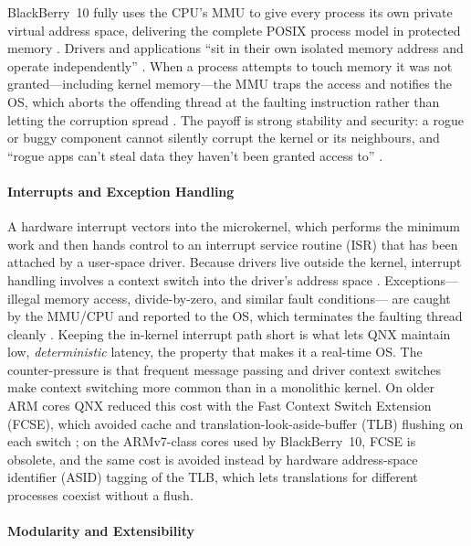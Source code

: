 BlackBerry~10 fully uses the CPU's MMU to give every process its own
private virtual address space, delivering the complete POSIX process
model in protected memory \citep{bb_microkernel_dev, qnx_memman}. Drivers and
applications ``sit in their own isolated memory address and operate
independently'' \citep{qnx_memman}. When a process attempts to touch
memory it was not granted---including kernel memory---the MMU traps the
access and notifies the OS, which aborts the offending thread at the
faulting instruction rather than letting the corruption spread
\citep{qnx_memman}. The payoff is strong stability and security: a rogue
or buggy component cannot silently corrupt the kernel or its neighbours,
and ``rogue apps can't steal data they haven't been granted access to''
\citep{crackberry_qnxhistory}.

\paragraph{Interrupts and Exception Handling}

A hardware interrupt vectors into the microkernel, which performs the
minimum work and then hands control to an interrupt service routine
(ISR) that has been attached by a user-space driver. Because drivers
live outside the kernel, interrupt handling involves a context switch
into the driver's address space \citep{qnx_arm_memory}. Exceptions---
illegal memory access, divide-by-zero, and similar fault conditions---
are caught by the MMU/CPU and reported to the OS, which terminates the
faulting thread cleanly \citep{qnx_memman}. Keeping the in-kernel
interrupt path short is what lets QNX maintain low, \emph{deterministic}
latency, the property that makes it a real-time OS. The counter-pressure
is that frequent message passing and driver context switches make
context switching more common than in a monolithic kernel. On older ARM
cores QNX reduced this cost with the Fast Context Switch Extension
(FCSE), which avoided cache and translation-look-aside-buffer (TLB)
flushing on each switch \citep{qnx_arm_memory}; on the ARMv7-class cores
used by BlackBerry~10, FCSE is obsolete, and the same cost is avoided
instead by hardware address-space identifier (ASID) tagging of the TLB,
which lets translations for different processes coexist without a flush.

\paragraph{Modularity and Extensibility}

